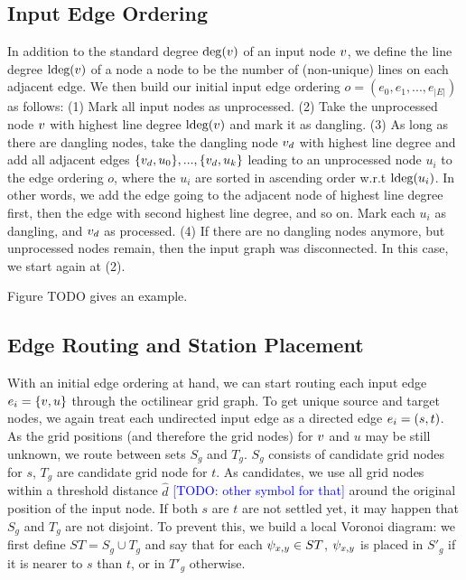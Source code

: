 \documentclass{sig-alternate-sigmod09}
\newcommand\TODO[1]{\textcolor{blue}{\small [TODO: #1]}}
\begin{document}
\subsection{Input Edge Ordering}

In addition to the standard degree $\deg(v)$ of an input node $v$, we define the line degree $\text{ldeg}(v)$ of a node a node to be the number of (non-unique) lines on each adjacent edge.
We then build our initial input edge ordering $o = (e_0, e_1, ..., e_{|E|})$ as follows:
  (1) Mark all input nodes as unprocessed.
  (2) Take the unprocessed node $v$ with highest line degree $\text{ldeg}(v)$ and mark it as dangling.
  (3) As long as there are dangling nodes, take the dangling node $v_d$ with highest line degree and add all adjacent edges $\{v_d, u_0\}, ..., \{v_d, u_k\}$ leading to an unprocessed node $u_i$ to the edge ordering $o$, where the $u_i$ are sorted in ascending order w.r.t $\text{ldeg}(u_i)$. In other words, we add the edge going to the adjacent node of highest line degree first, then the edge with second highest line degree, and so on. Mark each $u_i$ as dangling, and $v_d$ as processed. 
  (4) If there are no dangling nodes anymore, but unprocessed nodes remain, then the input graph was disconnected. In this case, we start again at (2).

Figure TODO gives an example.

\subsection{Edge Routing and Station Placement}

With an initial edge ordering at hand, we can start routing each input edge $e_i = \{v, u\}$ through the octilinear grid graph.
To get unique source and target nodes, we again treat each undirected input edge as a directed edge $e_i = (s, t)$.
As the grid positions (and therefore the grid nodes) for $v$ and $u$ may be still unknown, we route between sets $S_g$ and $T_g$.
$S_g$ consists of candidate grid nodes for $s$, $T_g$ are candidate grid node for $t$.
As candidates, we use all grid nodes within a threshold distance $\hat d$ \TODO{other symbol for that} around the original position of the input node.
If both $s$ are $t$ are not settled yet, it may happen that $S_g$ and $T_g$ are not disjoint.
To prevent this, we build a local Voronoi diagram: we first define $ST = S_g \cup T_g$ and say that for each $\psi_{x, y} \in ST$, $\psi_{x, y}$ is placed in $S'_g$ if it is nearer to $s$ than $t$, or in $T'_g$ otherwise.
\end{document}
